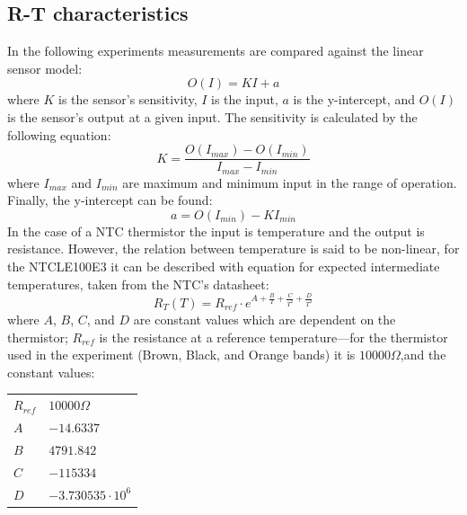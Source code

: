 \documentclass[a4,11pt]{article}
\begin{document}
\subsection{R-T characteristics}
In the following experiments measurements are compared against the linear sensor model:
\begin{equation}
  \label{eq:model}
  O(I)=KI+a
\end{equation}
where $K$ is the sensor's sensitivity, $I$ is the input, $a$ is the y-intercept, and $O(I)$ is the sensor's output at a given input. The sensitivity is calculated by the following equation:
\begin{equation}
  \label{eq:sensitivity}
  K=\frac{O(I_{max})-O(I_{min})}{I_{max}-I_{min}}
\end{equation}
where $I_{max}$ and $I_{min}$ are maximum and minimum input in the range of operation. Finally, the  y-intercept can be found:
\begin{equation}
  \label{eq:intercept}
  a=O(I_{min})-KI_{min}
\end{equation}
In the case of a NTC thermistor the input is temperature and the output is resistance. However, the relation between temperature is said to be non-linear, for the NTCLE100E3 it can be described with equation for expected intermediate temperatures, taken from the NTC's datasheet:
\begin{equation}
  \label{eq:datasheet}
  R_T(T)=R_{ref}\cdot e^{A+\frac{B}{T}+\frac{C}{T^2}+\frac{D}{T^3}}
\end{equation}
where $A$, $B$, $C$, and $D$ are constant values which are dependent on the thermistor; $R_{ref}$ is the resistance at a reference temperature---for the thermistor used in the experiment (Brown, Black, and Orange bands) it is $10000\Omega$,and the constant values:
\begin{center}
  \begin{tabular}{ll}
    \hline 
    $R_{ref}$  &  $10000\Omega$  \\
    $A$  &  $-14.6337$  \\
    $B$\footnotemark  &  $4791.842$  \\
    $C$  &  $-115334$  \\
    $D$  &  $-3.730535\cdot10^6$  \\
    \hline
  \end{tabular}
\end{center}
\end{document}
